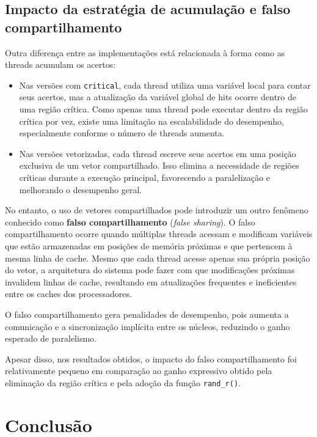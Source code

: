 \documentclass[a4paper, 12pt]{article}
\begin{document}
	\subsection{Impacto da estratégia de acumulação e falso compartilhamento}
	
	Outra diferença entre as implementações está relacionada à forma como as threads acumulam os acertos:
	
	\begin{itemize}
		\item Nas versões com \texttt{critical}, cada thread utiliza uma variável local para contar seus acertos, mas a atualização da variável global de hits ocorre dentro de uma região crítica. Como apenas uma thread pode executar dentro da região crítica por vez, existe uma limitação na escalabilidade do desempenho, especialmente conforme o número de threads aumenta.
		
		\item Nas versões vetorizadas, cada thread escreve seus acertos em uma posição exclusiva de um vetor compartilhado. Isso elimina a necessidade de regiões críticas durante a execução principal, favorecendo a paralelização e melhorando o desempenho geral.
	\end{itemize}
	
	No entanto, o uso de vetores compartilhados pode introduzir um outro fenômeno conhecido como \textbf{falso compartilhamento} (\textit{false sharing}). O falso compartilhamento ocorre quando múltiplas threads acessam e modificam variáveis que estão armazenadas em posições de memória próximas e que pertencem à mesma linha de cache. Mesmo que cada thread acesse apenas sua própria posição do vetor, a arquitetura do sistema pode fazer com que modificações próximas invalidem linhas de cache, resultando em atualizações frequentes e ineficientes entre os caches dos processadores.
	
	O falso compartilhamento gera penalidades de desempenho, pois aumenta a comunicação e a sincronização implícita entre os núcleos, reduzindo o ganho esperado de paralelismo.
	
	Apesar disso, nos resultados obtidos, o impacto do falso compartilhamento foi relativamente pequeno em comparação ao ganho expressivo obtido pela eliminação da região crítica e pela adoção da função \texttt{rand\_r()}.
	
	\section{Conclusão}
	
\end{document}

